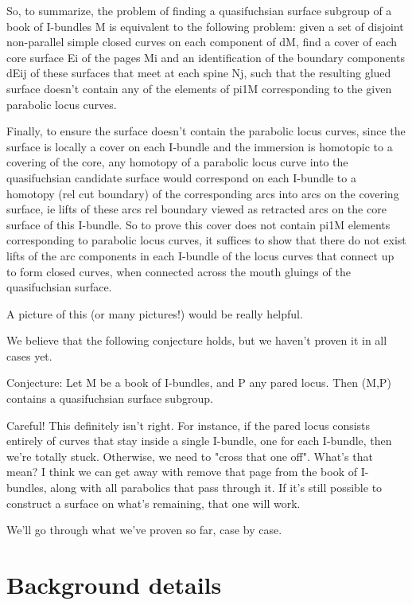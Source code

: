 \documentclass[12pt]{amsart}
\theoremstyle{definition}
\begin{document}
So, to summarize, the problem of finding a quasifuchsian surface subgroup of
a book of I-bundles M is equivalent to the following problem: given a set of
disjoint non-parallel simple closed curves on each component of dM, find
a cover of each core surface Ei of the pages Mi and an identification of the
boundary components dEij of these surfaces that meet at each spine Nj, such
that the resulting glued surface doesn't contain any of the elements of pi1M
corresponding to the given parabolic locus curves.

Finally, to ensure the surface doesn't contain the parabolic locus curves,
since the surface is locally a cover on each I-bundle and the immersion is
homotopic to a covering of the core, any homotopy of a parabolic locus curve
into the quasifuchsian candidate surface would correspond on each I-bundle to
a homotopy (rel cut boundary) of the corresponding arcs into arcs on the
covering surface, ie lifts of these arcs rel boundary viewed as retracted arcs
on the core surface of this I-bundle. So to prove this cover does not contain
pi1M elements corresponding to parabolic locus curves, it suffices to show that
there do not exist lifts of the arc components in each I-bundle of the locus
curves that connect up to form closed curves, when connected across the mouth
gluings of the quasifuchsian surface.

A picture of this (or many pictures!) would be really helpful.

We believe that the following conjecture holds, but we haven't proven it in all
cases yet.

Conjecture: Let M be a book of I-bundles, and P any pared locus. Then (M,P)
contains a quasifuchsian surface subgroup.

Careful! This definitely isn't right. For instance, if the pared locus consists
entirely of curves that stay inside a single I-bundle, one for each I-bundle,
then we're totally stuck. Otherwise, we need to "cross that one off". What's
that mean? I think we can get away with remove that page from the book of
I-bundles, along with all parabolics that pass through it. If it's still
possible to construct a surface on what's remaining, that one will work.

We'll go through what we've proven so far, case by case.

\section{Background details}
\end{document}
